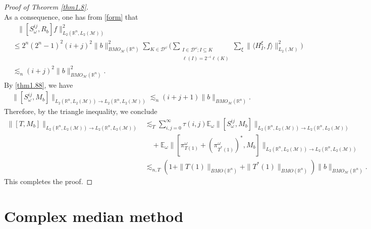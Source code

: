 \documentclass[oneside,english,a4wide]{amsart}
\numberwithin{equation}{section}
\numberwithin{figure}{section}
\theoremstyle{plain}
\theoremstyle{plain}
\theoremstyle{definition}
\theoremstyle{plain}
\theoremstyle{remark}
\theoremstyle{definition}
\theoremstyle{remark}
\theoremstyle{definition}
\newcommand{\8}{\infty}
\begin{document}
\begin{proof}[Proof of Theorem \ref{thm1.8}]
\begin{equation*}
	\end{equation*}
	As a consequence, one has from \eqref{form} that
	\begin{equation*}
		\begin{aligned}
			&\ \ \ \|[S_\omega^{ij},R_b]f\|^2_{L_2(\mathbb{R}^n,L_2(\mathcal{M}))}\\
			&\leq 2^n(2^n-1)^2(i+j)^2\|b\|^2_{BMO_\mathcal{M}(\mathbb{R}^n)} \sum_{K\in\mathcal{D}^\omega}\biggl(\sum_{\substack{I\in\mathcal{D}^\omega;I\subseteq K\\ \ell(I)=2^{-i}\ell(K)}}\sum_{\xi}\|\langle H_I^\xi,f\rangle\|_{L_2(\mathcal{M})}^2\biggr)\\
			&\lesssim_n (i+j)^2\|b\|^2_{BMO_\mathcal{M}(\mathbb{R}^n)}.
		\end{aligned}
	\end{equation*}
	By \eqref{thm1.88}, we have
	\begin{equation*}
		\begin{aligned}
			\|[S_\omega^{ij},M_b]\|_{L_2(\mathbb{R}^n,L_2(\mathcal{M}))\to L_2(\mathbb{R}^n,L_2(\mathcal{M}))}\lesssim_n (i+j+1)\|b\|_{BMO_\mathcal{M}(\mathbb{R}^n)}.
		\end{aligned}
	\end{equation*}
	Therefore, by the triangle inequality, we conclude
	\begin{equation*}
		\begin{aligned}
			\|[T,M_b]\|_{L_2(\mathbb{R}^n,L_2(\mathcal{M}))\to L_2(\mathbb{R}^n,L_2(\mathcal{M}))}{}
			&\lesssim_T \sum_{i,j=0}^\infty \tau(i, j)\mathbb{E}_\omega\|[S_\omega^{ij},M_b]\|_{L_2(\mathbb{R}^n,L_2(\mathcal{M}))\to L_2(\mathbb{R}^n,L_2(\mathcal{M}))}\\
			&\quad+\mathbb{E}_\omega\|[ \pi^\omega_{T(1)}+ (\pi^\omega_{T^*(1)})^*,M_b]\|_{L_2(\mathbb{R}^n,L_2(\mathcal{M}))\to L_2(\mathbb{R}^n,L_2(\mathcal{M}))}\\
			&\lesssim_{n,T} (1+\|T(1)\|_{BMO(\mathbb{R}^n)}+\|T^*(1)\|_{BMO(\mathbb{R}^n)})\|b\|_{BMO_\mathcal{M}(\mathbb{R}^n)}.
		\end{aligned}
	\end{equation*}
	This completes the proof.
\end{proof}


\bigskip





\section{Complex median method}\label{proofdivide}	
\end{document}
